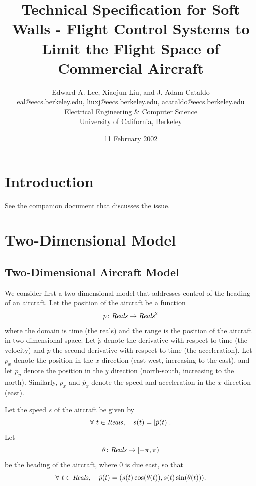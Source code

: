 \documentclass[11pt]{article}
\begin{document}


\title{Technical Specification for Soft Walls -
Flight Control Systems to Limit the Flight Space of Commercial Aircraft}
\author{Edward A. Lee, Xiaojun Liu, and J. Adam Cataldo\\
eal@eecs.berkeley.edu, liuxj@eecs.berkeley.edu, acataldo@eecs.berkeley.edu\\
Electrical Engineering \& Computer Science\\
University of California, Berkeley}
\date{11 February 2002}

\maketitle

\section{Introduction}

See the companion document that discusses the issue.

\section{Two-Dimensional Model}

\subsection{Two-Dimensional Aircraft Model}

We consider first a two-dimensional model that addresses
control of the heading of an aircraft.
Let the position of the aircraft be a function
\[
p \colon \mbox{\textit{Reals}} \to \mbox{\textit{Reals}} ^2
\]
where the domain is
time (the reals) and the range is the position of the aircraft
in two-dimensional space.
Let $\dot{p}$ denote the derivative with respect to time (the
velocity) and $\ddot{p}$ the second derivative with respect to time (the
acceleration). Let $p_x$ denote the position in the $x$ direction (east-west,
increasing to the east), and let $p_y$ denote the position in the $y$ direction
(north-south, increasing to the north). Similarly, $\dot{p_x}$ and $\ddot{p_x}$
denote the speed and acceleration in the $x$ direction (east).

Let the speed $s$ of the aircraft be given by
\[
\forall ~ t \in \mbox{\textit{Reals}}, \quad
s(t) = |\dot{p}(t)| .
\]
Let
\[
\theta \colon \mbox{\textit{Reals}} \to [-\pi, \pi)
\]
be the heading of the aircraft, where 0 is due east, so that
\[
\forall ~ t \in \mbox{\textit{Reals}}, \quad
\dot{p} (t) = (s(t) \cos(\theta (t)), s(t) \sin(\theta(t))) .
\]
\end{document}
